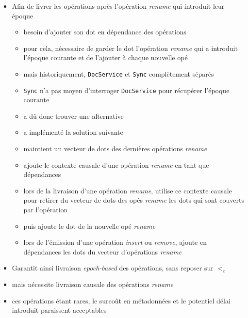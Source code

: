 \documentclass[12pt]{thesul}
\newcommand{\lepoch}{$<_{\varepsilon}$~}
\begin{document}
\begin{itemize}
  \item Afin de livrer les opérations après l'opération \emph{rename} qui introduit leur époque
  \begin{itemize}
    \item besoin d'ajouter son dot en dépendance des opérations
    \item pour cela, nécessaire de garder le dot l'opération \emph{rename} qui a introduit l'époque courante et de l'ajouter à chaque nouvelle opé
    \item mais historiquement, \texttt{DocService} et \texttt{Sync} complètement séparés
    \item \texttt{Sync} n'a pas moyen d'interroger \texttt{DocService} pour récupérer l'époque courante
    \item a dû donc trouver une alternative
    \item a implémenté la solution suivante
    \item maintient un vecteur de dots des dernières opérations \emph{rename}
    \item ajoute le contexte causale d'une opération \emph{rename} en tant que dépendances
    \item lors de la livraison d'une opération \emph{rename}, utilise ce contexte causale pour retirer du vecteur de dots des opés \emph{rename} les dots qui sont couverts par l'opération
    \item puis ajoute le dot de la nouvelle opé \emph{rename}
    \item lors de l'émission d'une opération \emph{insert} ou \emph{remove}, ajoute en dépendances les dots du vecteur d'opérations \emph{rename}
  \end{itemize}
  \item Garantit ainsi livraison \emph{epoch-based} des opérations, sans reposer sur \lepoch
  \item mais nécessite livraison causale des opérations \emph{rename}
  \item ces opérations étant rares, le surcoût en métadonnées et le potentiel délai introduit paraissent acceptables
\end{itemize}

\end{document}
